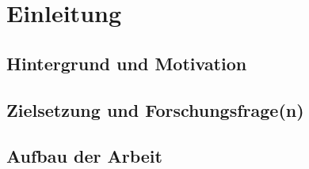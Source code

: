\chapter{Einleitung}


\section{Hintergrund und Motivation}


\section{Zielsetzung und Forschungsfrage(n)}


\section{Aufbau der Arbeit}
